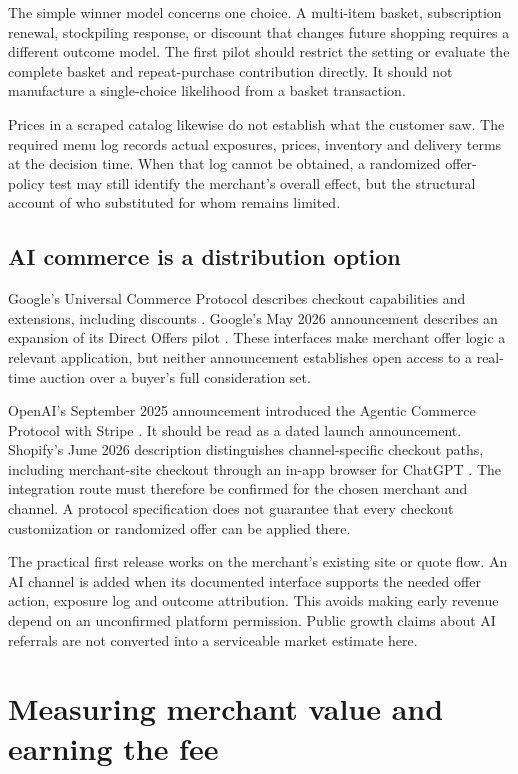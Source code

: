 \documentclass[11pt]{article}
\theoremstyle{remark}\newtheorem{example}{Example}
\begin{document}
The simple winner model concerns one choice. A multi-item basket, subscription
renewal, stockpiling response, or discount that changes future shopping requires
a different outcome model. The first pilot should restrict the setting or
evaluate the complete basket and repeat-purchase contribution directly. It
should not manufacture a single-choice likelihood from a basket transaction.

Prices in a scraped catalog likewise do not establish what the customer saw.
The required menu log records actual exposures, prices, inventory and delivery
terms at the decision time. When that log cannot be obtained, a randomized
offer-policy test may still identify the merchant's overall effect, but the
structural account of who substituted for whom remains limited.

\subsection{AI commerce is a distribution option}
Google's Universal Commerce Protocol describes checkout capabilities and
extensions, including discounts \citep{ucp}. Google's May 2026 announcement
describes an expansion of its Direct Offers pilot \citep{directoffers}. These
interfaces make merchant offer logic a relevant application, but neither
announcement establishes open access to a real-time auction over a buyer's
full consideration set.

OpenAI's September 2025 announcement introduced the Agentic Commerce Protocol
with Stripe \citep{acp}. It should be read as a dated launch announcement.
Shopify's June 2026 description distinguishes channel-specific checkout paths,
including merchant-site checkout through an in-app browser for ChatGPT
\citep{shopifycommerce}. The integration route must therefore be confirmed for
the chosen merchant and channel. A protocol specification does not guarantee
that every checkout customization or randomized offer can be applied there.

The practical first release works on the merchant's existing site or quote
flow. An AI channel is added when its documented interface supports the needed
offer action, exposure log and outcome attribution. This avoids making early
revenue depend on an unconfirmed platform permission. Public growth claims
about AI referrals are not converted into a serviceable market estimate here.

\section{Measuring merchant value and earning the fee}
\end{document}
